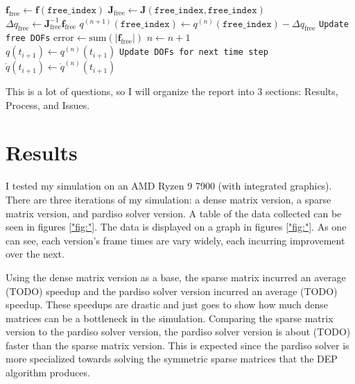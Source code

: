 \documentclass[letterpaper, 10 pt, conference]{ieeeconf}  %
\begin{document}
\begin{algorithm}[h]
\begin{algorithmic}[1]
                        \State $\mathbf{f}_\text{free} \gets \mathbf{f}(\texttt{free\_index})$
                        \State $\mathbf{J}_\text{free} \gets \mathbf{J}(\texttt{free\_index}, \texttt{free\_index})$\\
                        \State $\Delta q_\text{free} \gets \mathbf{J}_\text{free}^{-1} \mathbf{f}_\text{free}$
                        \State $q^{(n+1)}(\texttt{free\_index}) \gets q^{(n)}(\texttt{free\_index}) - \Delta q_\text{free}$ \hfill \texttt{Update free DOFs}
                        \State $\text{error} \gets \text{sum}(\lvert \mathbf{f}_\text{free} \rvert)$
                        \State $n \gets n + 1$ \\
                    \EndWhile
                    \State $q(t_{i+1}) \gets q^{(n)}(t_{i+1})$                  \hfill \texttt{Update DOFs for next time step}
                    \State $\dot{q}(t_{i+1}) \gets \dot{q}^{(n)}(t_{i+1})$
                \EndFunction
                \end{algorithmic}
                \end{algorithm}
\twocolumn


This is a lot of questions, so I will organize the report into 3 sections: Results, Process, and Issues. 

\section{Results}
I tested my simulation on an AMD Ryzen 9 7900 (with integrated graphics). There are three iterations of my simulation: a dense matrix version, a sparse matrix version, and pardiso solver version. A table of the data collected can be seen in figures \ref{"fig:"}. The data is displayed on a graph in figures \ref{"fig:"}. As one can see, each version's frame times are vary widely, each incurring improvement over the next. 

Using the dense matrix version as a base, the sparse matrix incurred an average (TODO) speedup and the pardiso solver version incurred an average (TODO) speedup. These speedups are drastic and just goes to show how much dense matrices can be a bottleneck in the simulation. Comparing the sparse matrix version to the pardiso solver version, the pardiso solver version is about (TODO) faster than the sparse matrix version. This is expected since the pardiso solver is more specialized towards solving the symmetric sparse matrices that the DEP algorithm produces.
\end{document}
